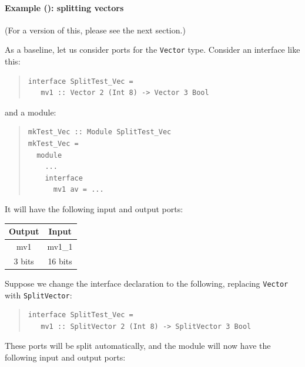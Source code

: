 \paragraph{Example (\BH): splitting vectors}

\label{sec:splitports_examples_BH_vectors}

\hspace*{1em}

{\footnotesize (For a {\BSVb} version of this, please see the next section.)}

As a baseline, let us consider ports for the {\tt Vector} type.
Consider an interface like this:

\begin{quote}
\begin{verbatim}
interface SplitTest_Vec =
   mv1 :: Vector 2 (Int 8) -> Vector 3 Bool
\end{verbatim}
\end{quote}

and a module:

\begin{quote}
\begin{verbatim}
mkTest_Vec :: Module SplitTest_Vec
mkTest_Vec =
  module
    ...
    interface
      mv1 av = ... 
\end{verbatim}
\end{quote}

It will have the following input and output ports:

\begin{center}
  \begin{tabular}{|c||c|}
    \hline
     Output &
     Input  \\
    \hline
     mv1     &
     mv1\_1   \\
     3  bits &
     16 bits \\
    \hline
  \end{tabular}
\end{center}

Suppose we change the interface declaration to the following,
replacing {\tt Vector} with {\tt SplitVector}:

\begin{quote}
\begin{verbatim}
interface SplitTest_Vec =
   mv1 :: SplitVector 2 (Int 8) -> SplitVector 3 Bool
\end{verbatim}
\end{quote}

These ports will be split automatically, and the module will now have
the following input and output ports:

